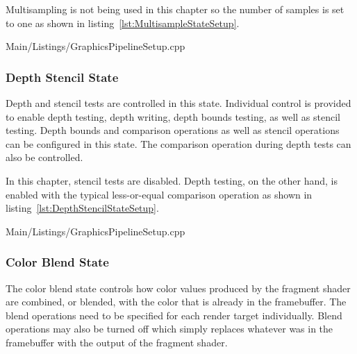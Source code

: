         Multisampling is not being used in this chapter so the number of samples is set to one as shown in listing~\ref{lst:MultisampleStateSetup}.

        
        {Main/Listings/GraphicsPipelineSetup.cpp}

      \subsubsection{Depth Stencil State}
        Depth and stencil tests are controlled in this state.
        Individual control is provided to enable depth testing, depth writing, depth bounds testing, as well as stencil testing.
        Depth bounds and comparison operations as well as stencil operations can be configured in this state.
        The comparison operation during depth tests can also be controlled.

        In this chapter, stencil tests are disabled.
        Depth testing, on the other hand, is enabled with the typical less-or-equal comparison operation as shown in listing~\ref{lst:DepthStencilStateSetup}.

        
        {Main/Listings/GraphicsPipelineSetup.cpp}

      \subsubsection{Color Blend State}
        The color blend state controls how color values produced by the fragment shader are combined, or blended, with the color that is already in the framebuffer.
        The blend operations need to be specified for each render target individually.
        Blend operations may also be turned off which simply replaces whatever was in the framebuffer with the output of the fragment shader.

